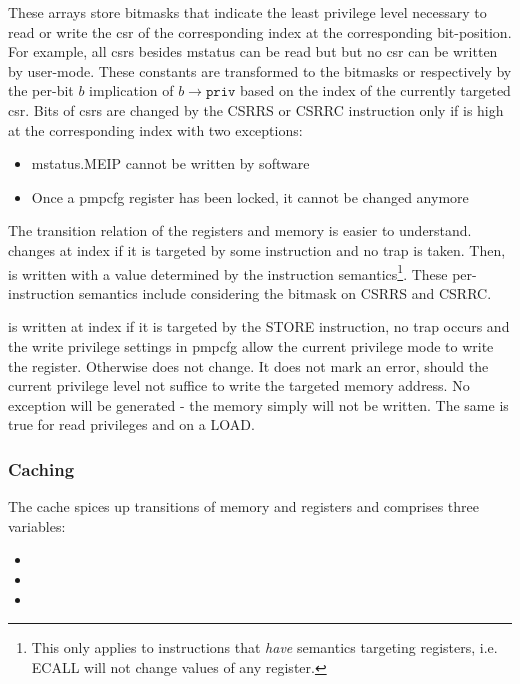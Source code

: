These arrays store bitmasks that indicate the least privilege level necessary to read or write the \gls{csr} of the corresponding index at the corresponding bit-position.
For example, all \glspl{csr} besides \gls{mstatus} can be read but but no \gls{csr} can be written by user-mode.
These constants are transformed to the bitmasks  or  respectively by the per-bit $ b $ implication of $ b \rightarrow \texttt{priv} $ based on the index of the currently targeted \gls{csr}.
Bits of \glspl{csr} are changed by the CSRRS or CSRRC instruction only if  is high at the corresponding index with two exceptions:
\begin{itemize}
    \item \gls{mstatus}.MEIP cannot be written by software
    \item Once a \gls{pmpcfg} register has been locked, it cannot be changed anymore
\end{itemize}

The transition relation of the registers and memory is easier to understand.
 changes at index  if it is targeted by some instruction and no trap is taken.
Then,  is written with a value determined by the instruction semantics\footnote{%
    This only applies to instructions that \textit{have} semantics targeting registers, i.e. ECALL will not change values of any register.
}.
These per-instruction semantics include considering the  bitmask on CSRRS and CSRRC.

 is written at index  if it is targeted by the STORE instruction, no trap occurs and the write privilege settings in \gls{pmpcfg} allow the current privilege mode to write the register.
Otherwise  does not change.
It does not mark an error, should the current privilege level not suffice to write the targeted memory address.
No exception will be generated - the memory simply will not be written.
The same is true for read privileges and  on a LOAD.

\subsubsection{Caching}

The cache spices up transitions of memory and registers and comprises three variables:
\begin{itemize}
    \item {}
    \item {}
    \item {}
\end{itemize}

